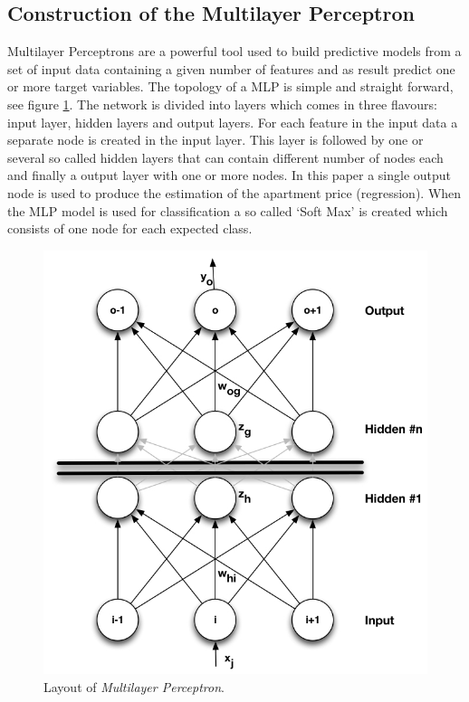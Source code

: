 \subsection{Construction of the Multilayer Perceptron} \label{sss:construction_mlp}
Multilayer Perceptrons are a powerful tool used to build predictive models from a set of input data containing a given number of features and as result predict one or more target variables. The topology of a MLP is simple and straight forward, see figure \ref{NeuralNet_InHidHidOut_full}. The network is divided into layers which comes in three flavours: input layer, hidden layers and output layers. For each feature in the input data a separate node is created in the input layer. This layer is followed by one or several so called hidden layers that can contain different number of nodes each and finally a output layer with one or more nodes. In this paper a single output node is used to produce the estimation of the apartment price (regression). When the MLP model is used for classification a so called `Soft Max' is created which consists of one node for each expected class. 
\
\begin{figure}[ht] 
\begin{center}
\includegraphics{NeuralNet_InHidOut-full.jpg}
\caption{Layout of \textit{Multilayer Perceptron}.}
\label{NeuralNet_InHidHidOut_full}
\end{center}
\end{figure}

